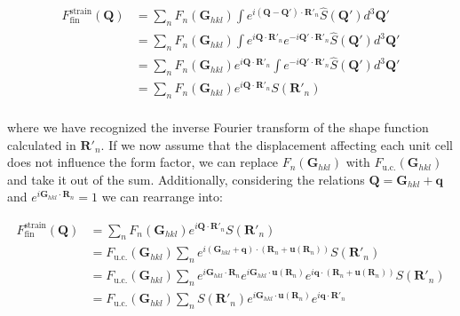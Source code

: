 \begin{equation}
    \begin{aligned}
    F^{\text{strain}}_{\text{fin}}(\mathbf{Q}) &=  
    \sum_{n} F_n(\mathbf{G}_{hkl}) \int  e^{i (\mathbf{Q} -\mathbf{Q'}) \cdot \mathbf{R}'_n} \widehat{S}(\mathbf{Q'})d^3\mathbf{Q'} \\ 
    &= \sum_{n} F_n(\mathbf{G}_{hkl}) \int  e^{i \mathbf{Q} \cdot \mathbf{R}'_n } e^{-i \mathbf{Q'} \cdot \mathbf{R}'_n} \widehat{S}(\mathbf{Q'})d^3\mathbf{Q'} \\ 
    &= \sum_{n} F_n(\mathbf{G}_{hkl}) e^{i \mathbf{Q} \cdot \mathbf{R}'_n } \int e^{-i \mathbf{Q'} \cdot \mathbf{R}'_n} \widehat{S}(\mathbf{Q'})d^3\mathbf{Q'} \\ 
    &= \sum_{n} F_n(\mathbf{G}_{hkl}) e^{i \mathbf{Q} \cdot \mathbf{R}'_n } S(\mathbf{R}'_n) \\
   \label{eq:strain_fin3}
    \end{aligned}
\end{equation}

where we have recognized the inverse Fourier transform of the shape function calculated in $\mathbf{R}'_n$. 
If we now assume that the displacement affecting each unit cell does not influence the form factor, 
we can replace $F_n(\mathbf{G}_{hkl})$ with $F_{\text{u.c.}}(\mathbf{G}_{hkl})$ and take it out of the sum. 
Additionally, considering the relations $\mathbf{Q} = \mathbf{G}_{hkl} + \mathbf{q}$ and $e^{i \mathbf{G}_{hkl} \cdot \mathbf{R}_n}  = 1$
we can rearrange into: 

\begin{equation}
    \begin{aligned}
        F^{\text{strain}}_{\text{fin}}(\mathbf{Q}) &= 
        \sum_{n} F_n(\mathbf{G}_{hkl}) e^{i \mathbf{Q} \cdot \mathbf{R}'_n} S(\mathbf{R}'_n) \\
        &= F_{\text{u.c.}}(\mathbf{G}_{hkl}) \sum_{n}  e^{i (\mathbf{G}_{hkl} + \mathbf{q}) \cdot  (\mathbf{R}_n + \mathbf{u}(\mathbf{R}_n)) } S(\mathbf{R}'_n) \\
        &= F_{\text{u.c.}}(\mathbf{G}_{hkl}) \sum_{n}  e^{i \mathbf{G}_{hkl}\cdot  \mathbf{R}_n} e^{i \mathbf{G}_{hkl} \cdot  \mathbf{u}(\mathbf{R}_n) } e^{i \mathbf{q} \cdot  (\mathbf{R}_n + \mathbf{u}(\mathbf{R}_n)) } S(\mathbf{R}'_n) \\
        &= F_{\text{u.c.}}(\mathbf{G}_{hkl}) \sum_{n} S(\mathbf{R}'_n) e^{i \mathbf{G}_{hkl} \cdot  \mathbf{u}(\mathbf{R}_n) } e^{i \mathbf{q} \cdot  \mathbf{R}'_n }
    \end{aligned}
    \label{eq:strain_fin4}
\end{equation}

